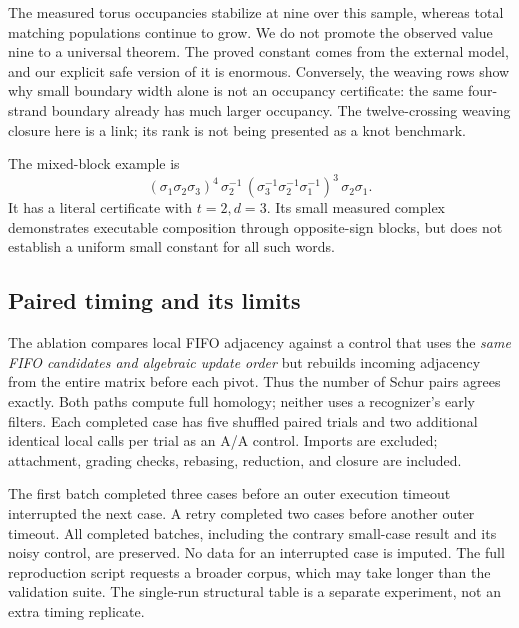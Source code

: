 \documentclass[11pt,letterpaper]{article}
\theoremstyle{remark}\newtheorem{remark}[theorem]{Remark}
\begin{document}
The measured torus occupancies stabilize at nine over this sample, whereas total matching populations continue to grow. We do not promote the observed value nine to a universal theorem. The proved constant comes from the external model, and our explicit safe version of it is enormous. Conversely, the weaving rows show why small boundary width alone is not an occupancy certificate: the same four-strand boundary already has much larger occupancy. The twelve-crossing weaving closure here is a link; its rank is not being presented as a knot benchmark.

The mixed-block example is
\[
 (\sigma_1\sigma_2\sigma_3)^4\,
 \sigma_2^{-1}\,
 (\sigma_3^{-1}\sigma_2^{-1}\sigma_1^{-1})^3\,
 \sigma_2\sigma_1.
\]
It has a literal certificate with $t=2,d=3$. Its small measured complex demonstrates executable composition through opposite-sign blocks, but does not establish a uniform small constant for all such words.

\subsection{Paired timing and its limits}
The ablation compares local FIFO adjacency against a control that uses the \emph{same FIFO candidates and algebraic update order} but rebuilds incoming adjacency from the entire matrix before each pivot. Thus the number of Schur pairs agrees exactly. Both paths compute full homology; neither uses a recognizer's early filters. Each completed case has five shuffled paired trials and two additional identical local calls per trial as an A/A control. Imports are excluded; attachment, grading checks, rebasing, reduction, and closure are included.

\begin{table}[htbp]\centering\small

\caption{Completed timing batches only. ``Paired ratio'' is the median of rebuild/local time ratios, not the ratio of the two displayed medians. ``A/A'' compares identical local implementations.}\label{tab:timing}
\end{table}

The first batch completed three cases before an outer execution timeout interrupted the next case. A retry completed two cases before another outer timeout. All completed batches, including the contrary small-case result and its noisy control, are preserved. No data for an interrupted case is imputed. The full reproduction script requests a broader corpus, which may take longer than the validation suite. The single-run structural table is a separate experiment, not an extra timing replicate.
\end{document}
